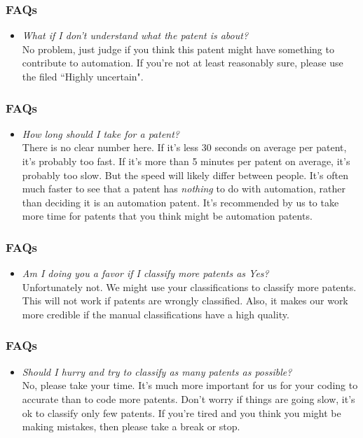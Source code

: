 \documentclass[10pt]{beamer}
\begin{document}
\begin{frame}\frametitle{FAQs}
	\begin{itemize}	
	\item \textit{What if I don't understand what the patent is about?}\\[0.1cm]
	No problem, just judge if you think this patent might have something to contribute to automation. If you're not at least reasonably sure, please use the filed ``Highly uncertain".
	\end{itemize}
\end{frame}
	
\begin{frame}\frametitle{FAQs}
	\begin{itemize}	
	\item \textit{How long should I take for a patent?}\\[0.1cm]
	There is no clear number here. If it's less 30 seconds on average per patent, it's probably too fast. If it's more than 5 minutes per patent on average, it's probably too slow. But the speed will likely differ between people. It's often much faster to see that a patent has \textit{nothing} to do with automation, rather than deciding it is an automation patent. It's recommended by us to take more time for patents that you think might be automation patents.
	\end{itemize}
\end{frame}

\begin{frame}\frametitle{FAQs}
	\begin{itemize}	
	\item \textit{Am I doing you a favor if I classify more patents as Yes?}\\[0.1cm]
	Unfortunately not. We might use your classifications to classify more patents. This will not work if patents are wrongly classified. Also, it makes our work more credible if the manual classifications have a high quality.
	\end{itemize}
\end{frame}
	
\begin{frame}\frametitle{FAQs}
	\begin{itemize}	
	\item \textit{Should I hurry and try to classify as many patents as possible?}\\[0.1cm]
	No, please take your time. It's much more important for us for your coding to accurate than to code more patents. Don't worry if things are going slow, it's ok to classify only few patents. If you're tired and you think you might be making mistakes, then please take a break or stop.
	\end{itemize}
\end{frame}
\end{document}
